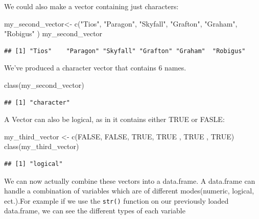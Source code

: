 \documentclass[
]{book}
\newenvironment{Shaded}{\begin{snugshade}}{\end{snugshade}}
\newcommand{\ConstantTok}[1]{\textcolor[rgb]{0.00,0.00,0.00}{#1}}
\newcommand{\FunctionTok}[1]{\textcolor[rgb]{0.00,0.00,0.00}{#1}}
\newcommand{\NormalTok}[1]{#1}
\newcommand{\OtherTok}[1]{\textcolor[rgb]{0.56,0.35,0.01}{#1}}
\newcommand{\StringTok}[1]{\textcolor[rgb]{0.31,0.60,0.02}{#1}}
\begin{document}
We could also make a vector containing just characters:

\begin{Shaded}
\begin{Highlighting}[]
\NormalTok{my\_second\_vector}\OtherTok{\textless{}{-}} \FunctionTok{c}\NormalTok{(}\StringTok{"Tios"}\NormalTok{, }\StringTok{"Paragon"}\NormalTok{, }\StringTok{"Skyfall"}\NormalTok{, }\StringTok{"Grafton"}\NormalTok{, }\StringTok{"Graham"}\NormalTok{, }\StringTok{"Robigus"}\NormalTok{ )}
\NormalTok{my\_second\_vector}
\end{Highlighting}
\end{Shaded}

\begin{verbatim}
## [1] "Tios"    "Paragon" "Skyfall" "Grafton" "Graham"  "Robigus"
\end{verbatim}

We've produced a character vector that contains 6 names.

\begin{Shaded}
\begin{Highlighting}[]
\FunctionTok{class}\NormalTok{(my\_second\_vector)}
\end{Highlighting}
\end{Shaded}

\begin{verbatim}
## [1] "character"
\end{verbatim}

A Vector can also be logical, as in it contains either TRUE or FASLE:

\begin{Shaded}
\begin{Highlighting}[]
\NormalTok{my\_third\_vector }\OtherTok{\textless{}{-}} \FunctionTok{c}\NormalTok{(}\ConstantTok{FALSE}\NormalTok{, }\ConstantTok{FALSE}\NormalTok{, }\ConstantTok{TRUE}\NormalTok{, }\ConstantTok{TRUE}\NormalTok{ , }\ConstantTok{TRUE}\NormalTok{ , }\ConstantTok{TRUE}\NormalTok{)}
\FunctionTok{class}\NormalTok{(my\_third\_vector)}
\end{Highlighting}
\end{Shaded}

\begin{verbatim}
## [1] "logical"
\end{verbatim}

We can now actually combine these vectors into a data.frame. A data.frame can handle a combination of variables which are of different modes(numeric, logical, ect.).For example if we use the \texttt{str()} function on our previously loaded data.frame, we can see the different types of each variable
\end{document}
